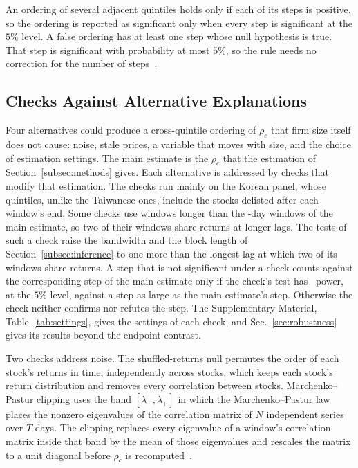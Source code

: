 \documentclass[a4paper,fleqn]{cas-sc}
\begin{document}
An ordering of several adjacent quintiles holds only if each of its steps is positive, so the ordering is reported as significant only when every step is significant at the $5\%$ level. A false ordering has at least one step whose null hypothesis is true. That step is significant with probability at most $5\%$, so the rule needs no correction for the number of steps~\citep{berger1982multiparameter}.

\subsection{Checks Against Alternative Explanations}\label{subsec:checks}

Four alternatives could produce a cross-quintile ordering of $\rho_c$ that firm size itself does not cause: noise, stale prices, a variable that moves with size, and the choice of estimation settings. The main estimate is the $\rho_c$ that the estimation of Section~\ref{subsec:methods} gives. Each alternative is addressed by checks that modify that estimation. The checks run mainly on the Korean panel, whose quintiles, unlike the Taiwanese ones, include the stocks delisted after each window's end. Some checks use windows longer than the \paperWindowDays-day windows of the main estimate, so two of their windows share returns at longer lags. The tests of such a check raise the bandwidth and the block length of Section~\ref{subsec:inference} to one more than the longest lag at which two of its windows share returns. A step that is not significant under a check counts against the corresponding step of the main estimate only if the check's test has \detectPowerPct\ power, at the $5\%$ level, against a step as large as the main estimate's step. Otherwise the check neither confirms nor refutes the step. The Supplementary Material, Table~\ref{tab:settings}, gives the settings of each check, and Sec.~\ref{sec:robustness} gives its results beyond the endpoint contrast.

Two checks address noise. The shuffled-returns null permutes the order of each stock's returns in time, independently across stocks, which keeps each stock's return distribution and removes every correlation between stocks. Marchenko--Pastur clipping uses the band $[\lambda_-, \lambda_+]$ in which the Marchenko--Pastur law places the nonzero eigenvalues of the correlation matrix of $N$ independent series over $T$ days. The clipping replaces every eigenvalue of a window's correlation matrix inside that band by the mean of those eigenvalues and rescales the matrix to a unit diagonal before $\rho_c$ is recomputed~\citep{laloux1999noise}.
\end{document}
